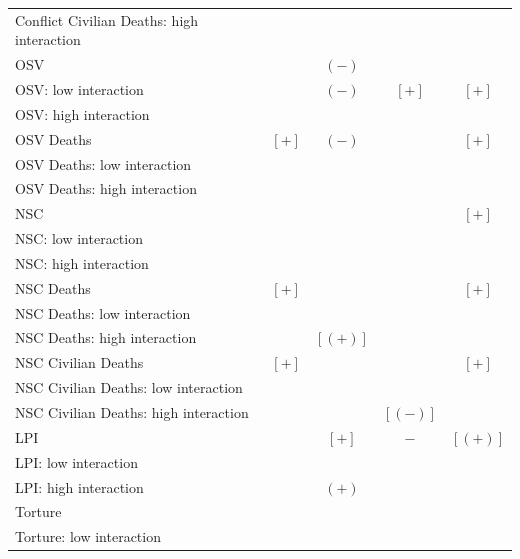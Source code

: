 \documentclass[12pt]{article}
\begin{document}
\begin{table}[!htbp]
\begin{tabular}{lc|c|c|c}
\qquad Conflict Civilian Deaths: high interaction &       &         &         & \\
OSV                                               &       & $(-)$   &         & \\
\qquad OSV: low interaction                       &       & $(-)$   & $[+]$   & $[+]$ \\
\qquad OSV: high interaction                      &       &         &         & \\
OSV Deaths                                        & $[+]$ & $(-)$   &         & $[+]$ \\
\qquad OSV Deaths: low interaction                &       &         &         & \\
\qquad OSV Deaths: high interaction               &       &         &         & \\
NSC                                               &       &         &         & $[+]$ \\
\qquad NSC: low interaction                       &       &         &         & \\
\qquad NSC: high interaction                      &       &         &         & \\
NSC Deaths                                        & $[+]$ &         &         & $[+]$ \\
\qquad NSC Deaths: low interaction                &       &         &         & \\
\qquad NSC Deaths: high interaction               &       & $[(+)]$ &         & \\
NSC Civilian Deaths                               & $[+]$ &         &         & $[+]$ \\
\qquad NSC Civilian Deaths: low interaction       &       &         &         & \\
\qquad NSC Civilian Deaths: high interaction      &       &         & $[(-)]$ & \\
LPI                                               &       & $[+]$   & $-$     & $[(+)]$ \\
\qquad LPI: low interaction                       &       &         &         & \\
\qquad LPI: high interaction                      &       & $(+)$   &         & \\
Torture                                           &       &         &         & \\
\qquad Torture: low interaction                   &       &         &         &   \\

\end{tabular}
\end{table}
\end{document}
